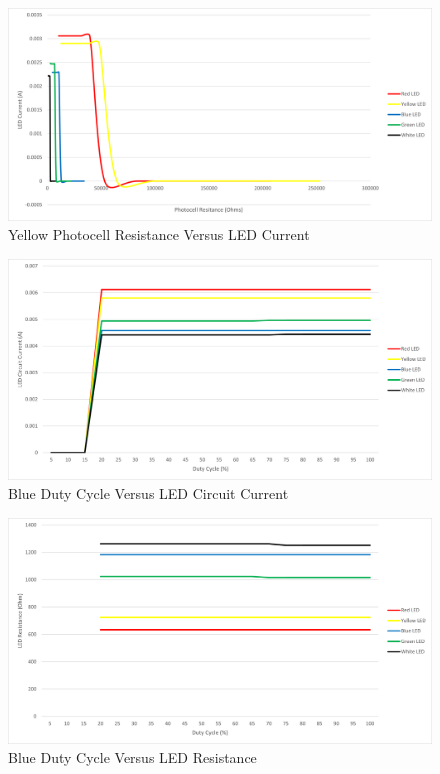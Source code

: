 \documentclass[12pt,titlepage]{article}
\begin{document}
\begin{figure}[!htb]
  \centering
  \includegraphics[width=5in]{lab_4/photo_res_led_curr.png}
  \caption{Yellow Photocell Resistance Versus LED Current}
\end{figure}
\begin{figure}[!htb]
  \centering
  \includegraphics[width=5in]{lab_4/duty_cycle_led_circuit_curr.png}
  \caption{Blue Duty Cycle Versus LED Circuit Current}
\end{figure}
\begin{figure}[!htb]
  \centering
  \includegraphics[width=5in]{lab_4/duty_cycle_led_res.png}
  \caption{Blue Duty Cycle Versus LED Resistance}
\end{figure}
\end{document}
